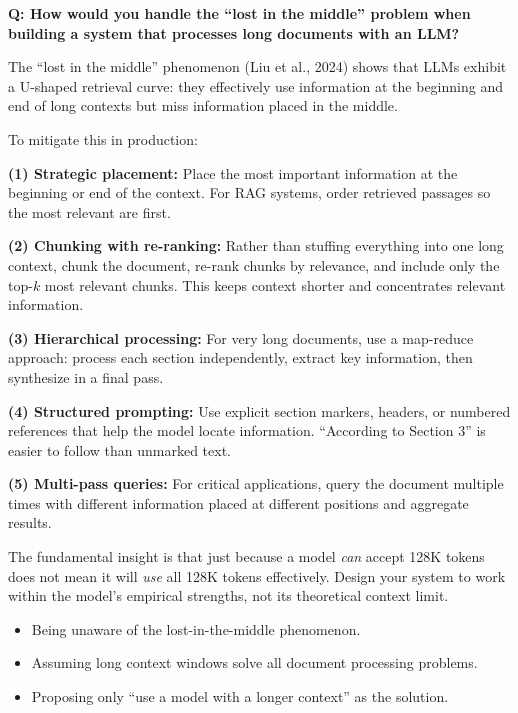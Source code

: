 \begin{interviewq}
\end{interviewq}

\begin{interviewq}
\textbf{Q: How would you handle the ``lost in the middle'' problem when
building a system that processes long documents with an LLM?}

 \quad {} \quad
\badgefreq{\freqmed}

\stronganswer
The ``lost in the middle'' phenomenon (Liu et al., 2024) shows that LLMs
exhibit a U-shaped retrieval curve: they effectively use information at the
beginning and end of long contexts but miss information placed in the middle.

To mitigate this in production:

\textbf{(1) Strategic placement:} Place the most important information at the
beginning or end of the context.  For RAG systems, order retrieved passages
so the most relevant are first.

\textbf{(2) Chunking with re-ranking:} Rather than stuffing everything into
one long context, chunk the document, re-rank chunks by relevance, and
include only the top-$k$ most relevant chunks.  This keeps context shorter
and concentrates relevant information.

\textbf{(3) Hierarchical processing:} For very long documents, use a
map-reduce approach: process each section independently, extract key
information, then synthesize in a final pass.

\textbf{(4) Structured prompting:} Use explicit section markers, headers, or
numbered references that help the model locate information.  ``According to
Section 3'' is easier to follow than unmarked text.

\textbf{(5) Multi-pass queries:} For critical applications, query the
document multiple times with different information placed at different
positions and aggregate results.

The fundamental insight is that just because a model \emph{can} accept 128K
tokens does not mean it will \emph{use} all 128K tokens effectively.  Design
your system to work within the model's empirical strengths, not its
theoretical context limit.

\redflags
\begin{itemize}
\item Being unaware of the lost-in-the-middle phenomenon.
\item Assuming long context windows solve all document processing problems.
\item Proposing only ``use a model with a longer context'' as the solution.
\end{itemize}


\end{interviewq}
